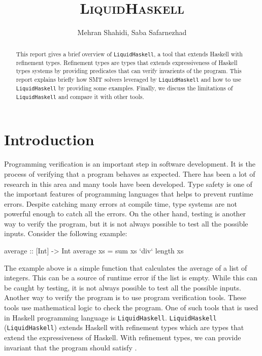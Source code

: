 \documentclass[]{rptuseminar}
\title{\textsc{Liquid}{H}\textsc{askell}}
\author{Mehran Shahidi, Saba Safarnezhad
  \institute{Rheinland-Pfälzische Technische Universität Kaiserslautern-Landau, Department of Computer Science}}
\begin{document}

\maketitle


\begin{abstract}
  This report gives a brief overview of \texttt{LiquidHaskell}, a tool that extends Haskell with refinement types. 
  Refinement types are types that extends expressiveness of Haskell types systems by providing predicates that can verify
  invarients of the program. This report explains briefly how SMT solvers leveraged by \texttt{LiquidHaskell} and 
  how to use \texttt{LiquidHaskell} by providing some examples. Finally, we discuss the limitations of \texttt{LiquidHaskell} and compare it with other tools.
\end{abstract}


\section{Introduction}
\label{sec:introduction}
Programming verification is an important step in software development. It is the process of
verifying that a program behaves as expected. There has been a lot of research in this 
area and many tools have been developed. 
Type safety is one of the important features of programming languages that helps to prevent runtime errors.
Despite catching many errors at compile time, type systems are not powerful enough to catch all the errors.
On the other hand, testing is another way to verify the program, but it is not always possible to test all the possible inputs.
Consider the following example:

\begin{haskell}
  average    :: [Int] -> Int
  average xs = sum xs `div` length xs
\end{haskell}

The example above is a simple function that calculates the average of a list of integers. This can be a source of runtime
error if the list is empty. While this can be caught by testing, it is not always possible to test all the possible inputs.
Another way to verify the program is to use program verification tools. These tools use mathematical logic to check the program.
One of such tools that is used in Haskell programming language is \texttt{LiquidHaskell}. \texttt{LiquidHaskell} 
(\texttt{LiquidHaskell}) extends Haskell with refinement types which are types that extend the expressiveness of Haskell.
With refinement types, we can provide invariant that the program should satisfy \cite{jhala_programming_2020}. 
\end{document}
